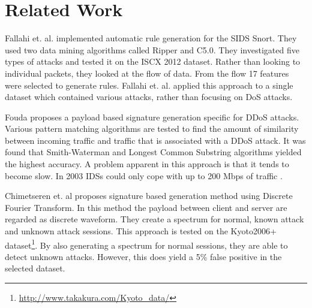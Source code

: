 \section{Related Work}
Fallahi et. al. \cite{Fallahi2016} implemented automatic rule generation for the SIDS Snort. They used two data mining algorithms called Ripper and C5.0. They investigated five types of attacks and tested it on the ISCX 2012 dataset. Rather than looking to individual packets, they looked at the flow of data. From the flow 17 features were selected to generate rules. Fallahi et. al. applied this approach to a single dataset which contained various attacks, rather than focusing on DoS attacks. 

Fouda \cite{Fouda2017} proposes a payload based signature generation specific for DDoS attacks. Various pattern matching algorithms are tested to find the amount of similarity between incoming traffic and traffic that is associated with a DDoS attack. It was found that Smith-Waterman and Longest Common Substring algorithms yielded the highest accuracy. A problem apparent in this approach is that it tends to become slow. In 2003 IDSs could only cope with up to 200 Mbps of traffic \cite{Lai2004}. 

Chimetseren et. al \cite{Chimetseren2014} proposes signature based generation method using Discrete Fourier Transform. In this method the payload between client and server are regarded as discrete waveform. They create a spectrum for normal, known attack and unknown attack sessions.  This approach is tested on the Kyoto2006+ dataset\footnote{\url{http://www.takakura.com/Kyoto_data/}}. By also generating a spectrum for normal sessions, they are able to detect unknown attacks. However, this does yield a 5\% false positive in the selected dataset.  

